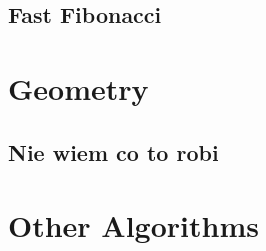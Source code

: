 \documentclass[13pt]{article}
\begin{document}
\subsection{Fast Fibonacci}\label{sub:fast_fibonacci} %


\section{Geometry}

\subsection{Nie wiem co to robi}\label{sub:nie_wiem_co_to_robi} %



\section{Other Algorithms}


\end{document}
